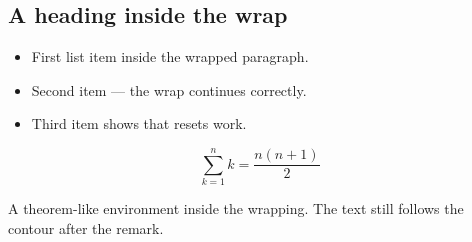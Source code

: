 \lipsum[1]

\subsection*{A heading inside the wrap}
\lipsum[2]

\begin{itemize}
  \item First list item inside the wrapped paragraph.
  \item Second item — the wrap continues correctly.
  \item Third item shows that \texttt{\string\everypar} resets work.
\end{itemize}

\lipsum[3]

\[
  \sum_{k=1}^{n} k = \frac{n(n+1)}{2}
\]

\lipsum[4]

\begin{remark}
  A theorem-like environment inside the wrapping.
  The text still follows the contour after the remark.
\end{remark}

\lipsum[5-6]
